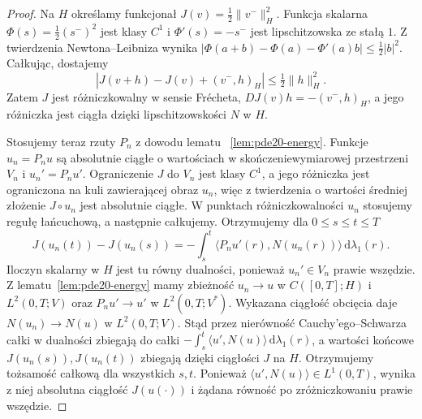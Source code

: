 \begin{proof}
Na $H$ określamy funkcjonał
$J(v)=\frac12\|v^-\|_H^2$.
Funkcja skalarna $\Phi(s)=\frac12(s^-)^2$ jest klasy
$C^1$ i $\Phi'(s)=-s^-$ jest lipschitzowska
ze stałą $1$. Z twierdzenia Newtona--Leibniza wynika
$|\Phi(a+b)-\Phi(a)-\Phi'(a)b|\le\frac12|b|^2$.
Całkując, dostajemy
\[
 |J(v+h)-J(v)+(v^-,h)_H|\le\tfrac12\|h\|_H^2.
\]
Zatem $J$ jest różniczkowalny w sensie Frécheta,
$DJ(v)h=-(v^-,h)_H$, a jego różniczka jest ciągła
dzięki lipschitzowskości $N$ w $H$.

Stosujemy teraz rzuty $P_n$ z dowodu lematu
~\ref{lem:pde20-energy}. Funkcje $u_n=P_nu$ są
absolutnie ciągłe o wartościach w skończeniewymiarowej przestrzeni $V_n$ i $u_n'=P_nu'$.
Ograniczenie $J$ do $V_n$ jest klasy $C^1$,
a jego różniczka jest ograniczona na kuli
zawierającej obraz $u_n$, więc z twierdzenia
o wartości średniej złożenie $J\circ u_n$
jest absolutnie ciągłe. W punktach różniczkowalności
$u_n$ stosujemy regułę łańcuchową, a następnie
całkujemy. Otrzymujemy dla $0\le s\le t\le T$
\[
 J(u_n(t))-J(u_n(s))
 =-\int_s^t\langle P_nu'(r),N(u_n(r))\rangle
 \,\mathrm d\lambda_1(r).
\]
Iloczyn skalarny w $H$ jest tu równy dualności,
ponieważ $u_n'\in V_n$ prawie wszędzie.
Z lematu~\ref{lem:pde20-energy} mamy zbieżność
$u_n\to u$ w $C([0,T];H)$ i $L^2(0,T;V)$
oraz $P_nu'\to u'$ w $L^2(0,T;V^*)$.
Wykazana ciągłość obcięcia daje
$N(u_n)\to N(u)$ w $L^2(0,T;V)$.
Stąd przez nierówność Cauchy'ego--Schwarza
całki w dualności zbiegają do całki
$-\int_s^t\langle u',N(u)\rangle\,\mathrm d\lambda_1(r)$,
a wartości końcowe $J(u_n(s)),J(u_n(t))$ zbiegają
dzięki ciągłości $J$ na $H$.
Otrzymujemy tożsamość całkową dla wszystkich $s,t$.
Ponieważ $\langle u',N(u)\rangle\in L^1(0,T)$,
wynika z niej absolutna ciągłość $J(u(\cdot))$
i żądana równość po zróżniczkowaniu prawie wszędzie.
\end{proof}

